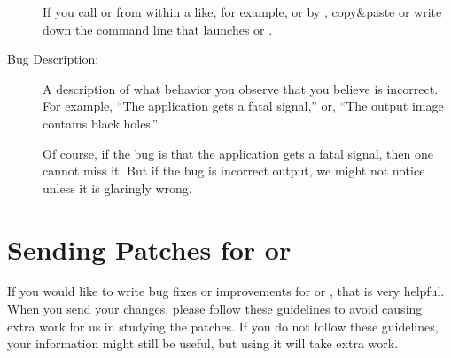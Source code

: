 \begin{description}
  If you call \App{} or \OtherApp{} from within a  like, for example,
   or  by , copy\&paste or write down the command line that launches \App{} or \OtherApp{}.

\item[Bug Description:] A description of what behavior you observe that you believe is
  incorrect.  For example, ``The application gets a fatal signal,'' or, ``The output image
  contains black holes.''

  Of course, if the bug is that the application gets a fatal signal, then one cannot miss it.
  But if the bug is incorrect output, we might not notice unless it is glaringly wrong.
\end{description}


\section[Sending Patches]{\label{sec:sending-patches}%
  Sending Patches for \App{} or \OtherApp{}}

If you would like to write bug fixes or improvements for \App{} or \OtherApp{}, that is very
helpful.  When you send your changes, please follow these guidelines to avoid causing extra work
for us in studying the patches.  If you do not follow these guidelines, your information might
still be useful, but using it will take extra work.

